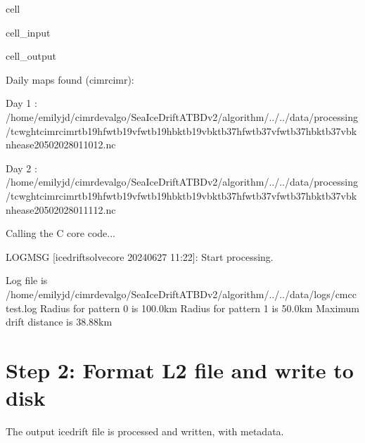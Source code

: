\documentclass[letterpaper,10pt,english]{jupyterBook}
\begin{document}
\begin{sphinxuseclass}{cell}
\begin{sphinxVerbatimInput}
\begin{sphinxuseclass}{cell_input}
\end{sphinxuseclass}\end{sphinxVerbatimInput}
\begin{sphinxVerbatimOutput}

\begin{sphinxuseclass}{cell_output}
\begin{sphinxVerbatim}[commandchars=\\\{\}]
Daily maps found (cimr\PYGZhy{}cimr):

	Day 1 : /home/emilyjd/cimr\PYGZhy{}devalgo/SeaIceDrift\PYGZus{}ATBD\PYGZus{}v2/algorithm/../../data/processing/tc\PYGZus{}wght\PYGZus{}cimr\PYGZhy{}cimr\PYGZus{}tb19hfw\PYGZhy{}tb19vfw\PYGZhy{}tb19hbk\PYGZhy{}tb19vbk\PYGZhy{}tb37hfw\PYGZhy{}tb37vfw\PYGZhy{}tb37hbk\PYGZhy{}tb37vbk\PYGZus{}nh\PYGZhy{}ease2\PYGZhy{}050\PYGZus{}2028011012.nc 

	Day 2 : /home/emilyjd/cimr\PYGZhy{}devalgo/SeaIceDrift\PYGZus{}ATBD\PYGZus{}v2/algorithm/../../data/processing/tc\PYGZus{}wght\PYGZus{}cimr\PYGZhy{}cimr\PYGZus{}tb19hfw\PYGZhy{}tb19vfw\PYGZhy{}tb19hbk\PYGZhy{}tb19vbk\PYGZhy{}tb37hfw\PYGZhy{}tb37vfw\PYGZhy{}tb37hbk\PYGZhy{}tb37vbk\PYGZus{}nh\PYGZhy{}ease2\PYGZhy{}050\PYGZus{}2028011112.nc 



Calling the C core code...
 
 LOGMSG [icedrift\PYGZus{}solve\PYGZus{}core 2024\PYGZhy{}06\PYGZhy{}27 11:22]:
	Start processing.
 
	Log file is \PYGZlt{}/home/emilyjd/cimr\PYGZhy{}devalgo/SeaIceDrift\PYGZus{}ATBD\PYGZus{}v2/algorithm/../../data/logs/cmcc\PYGZhy{}test.log\PYGZgt{}
	Radius for pattern \PYGZsh{}0 is 100.0km
	Radius for pattern \PYGZsh{}1 is 50.0km
	Maximum drift distance is 38.88km
\end{sphinxVerbatim}

\end{sphinxuseclass}\end{sphinxVerbatimOutput}

\end{sphinxuseclass}

\section{Step 2: Format L2 file and write to disk}
\label{\detokenize{CIMR_L2_Sea_Ice_Drift_algorithm:step-2-format-l2-file-and-write-to-disk}}
\sphinxAtStartPar
The output icedrift file is processed and written, with metadata.
\end{document}
